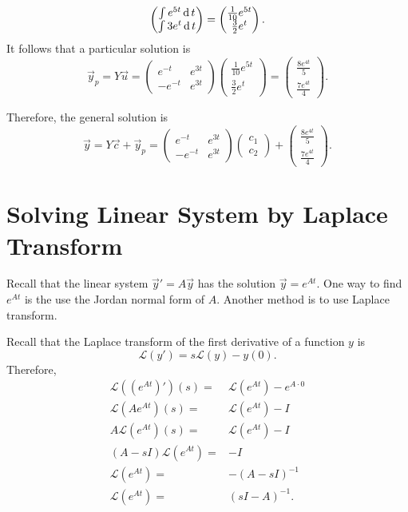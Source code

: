 \begin{solution}
\[\begin{pmatrix}
      \int e^{5t}\operatorname{d} t\\ \int 3e^{t}\operatorname{d} t 
    \end{pmatrix}
    =\begin{pmatrix}
      \frac{1}{10}e^{5t} \\ \frac{3}{2}e^{t}
    \end{pmatrix}.
\]
It follows that a particular solution is
\[
\vec{y}_p=Y\vec{u}= \begin{pmatrix}
  e^{-t} & e^{3t}\\
  -e^{-t} &  e^{3t}
\end{pmatrix}\begin{pmatrix}
  \frac{1}{10}e^{5t} \\ \frac{3}{2}e^{t}
\end{pmatrix}
=\begin{pmatrix}
  \frac{8e^{4t}}{5} \\ \frac{7e^{4t}}{4}
\end{pmatrix}.
\]

Therefore, the general solution is
\[
\vec{y}=Y\vec{c}+\vec{y}_p= \begin{pmatrix}
  e^{-t} & e^{3t}\\
  -e^{-t} &  e^{3t}\end{pmatrix}
  \begin{pmatrix}
    c_1\\ c_2
  \end{pmatrix}
  + \begin{pmatrix}
  \frac{8e^{4t}}{5} \\ \frac{7e^{4t}}{4}
\end{pmatrix}.
\]
\end{solution}

\section{Solving Linear System by Laplace Transform}

Recall that the linear system $\vec{y}'=A\vec{y}$ has the solution $\vec{y}=e^{At}$. One way to find $e^{At}$ is the use the Jordan normal form of $A$. Another method is to use Laplace transform.

Recall that the Laplace transform of the first derivative of a function $y$ is
\[\mathcal{L}(y')=s \mathcal{L}(y)-y(0).\]
Therefore,
\[
\begin{aligned}
  \mathcal{L}((e^{At})')(s)=&\mathcal{L}(e^{At})-e^{A\cdot 0}\\
  \mathcal{L}(Ae^{At})(s)=&\mathcal{L}(e^{At})-I\\
  A\mathcal{L}(e^{At})(s)=&\mathcal{L}(e^{At})-I\\
  (A-sI)\mathcal{L}(e^{At})=&-I\\
  \mathcal{L}(e^{At})=&-(A-sI)^{-1}\\
  \mathcal{L}(e^{At})=&(sI-A)^{-1}.
\end{aligned}  
\]

